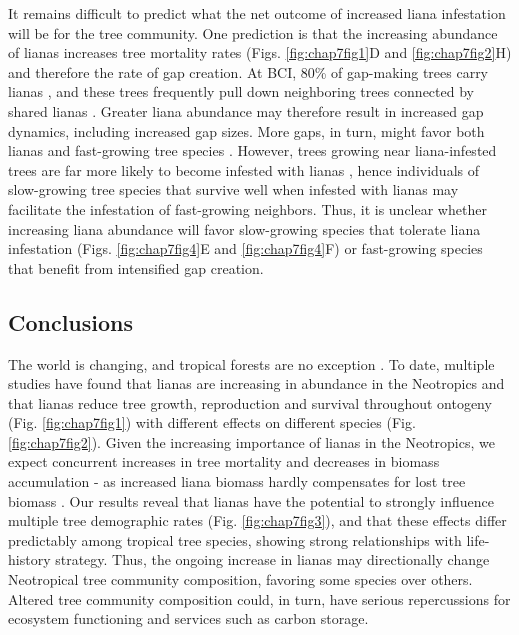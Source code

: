 \documentclass[b5paper,justified]{tufte-book} %
\begin{document}
\begin{fullwidth}
It remains difficult to predict what the net outcome of increased liana infestation will be for the tree community. One prediction is that the increasing abundance of lianas increases tree mortality rates (Figs. \ref{fig:chap7fig1}D and \ref{fig:chap7fig2}H) and therefore the rate of gap creation. At BCI, 80\% of gap-making trees carry lianas \citep{Ingwell2010}, and these trees frequently pull down neighboring trees connected by shared lianas  \citep[on average 2.6 trees > 10 cm][]{Putz1984a}. Greater liana abundance may therefore result in increased gap dynamics, including increased gap sizes. More gaps, in turn, might favor both lianas and fast-growing tree species  \citep{Schnitzer2000, Schnitzer2010, Ledo2014}. However, trees growing near liana-infested trees are far more likely to become infested with lianas  \citep{Heijden2008}, hence individuals of slow-growing tree species that survive well when infested with lianas may facilitate the infestation of fast-growing neighbors. Thus, it is unclear whether increasing liana abundance will favor slow-growing species that tolerate liana infestation (Figs. \ref{fig:chap7fig4}E and \ref{fig:chap7fig4}F) or fast-growing species that benefit from intensified gap creation.
	
\subsection{Conclusions}
The world is changing, and tropical forests are no exception  \citep{Malhi2014}. To date, multiple studies have found that lianas are increasing in abundance in the Neotropics  \citep[reviewed in][]{Schnitzer2011, Wright2015} and that lianas reduce tree growth, reproduction and survival  \citep{Heijden2008, Ingwell2010, Wright2015} throughout ontogeny (Fig. \ref{fig:chap7fig1}) with different effects on different species (Fig. \ref{fig:chap7fig2}). Given the increasing importance of lianas in the Neotropics, we expect concurrent increases in tree mortality and decreases in biomass accumulation - as increased liana biomass hardly compensates for lost tree biomass  \citep{Schnitzer2014, Heijden2015}. Our results reveal that lianas have the potential to strongly influence multiple tree demographic rates (Fig. \ref{fig:chap7fig3}), and that these effects differ predictably among tropical tree species, showing strong relationships with life-history strategy. Thus, the ongoing increase in lianas may directionally change Neotropical tree community composition, favoring some species over others. Altered tree community composition could, in turn, have serious repercussions for ecosystem functioning and services such as carbon storage.

\end{fullwidth}
\end{document}
